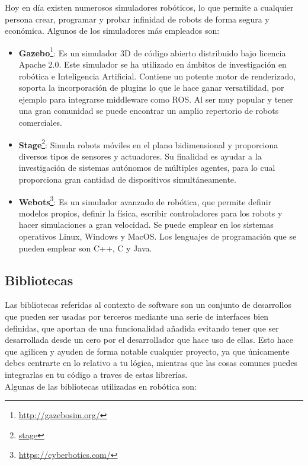 Hoy en día existen numerosos simuladores robóticos, lo que permite a cualquier persona crear, programar y probar infinidad de robots de forma segura y económica. Algunos de los simuladores más empleados son:

\begin{itemize}
\item \textbf{Gazebo}\footnote{\url{http://gazebosim.org/}}: Es un simulador 3D de código abierto distribuido bajo licencia Apache 2.0. Este simulador se ha utilizado en ámbitos de investigación en robótica e Inteligencia Artificial. Contiene un potente motor de renderizado, soporta la incorporación de plugins lo que le hace ganar versatilidad, por ejemplo para integrarse middleware como ROS. Al ser muy popular y tener una gran comunidad se puede encontrar un amplio repertorio de robots comerciales.
\item \textbf{Stage}\footnote{\href{http://playerstage.sourceforge.net/index.php?src=stage}{stage}}: Simula robots móviles en el plano bidimensional y proporciona diversos tipos de sensores y actuadores. Su finalidad es ayudar a la investigación de sistemas autónomos de múltiples agentes, para lo cual proporciona gran cantidad de dispositivos simultáneamente.
\item \textbf{Webots}\footnote{\url{https://cyberbotics.com/}}: Es un simulador avanzado de robótica, que permite definir modelos propios, definir la física, escribir controladores para los robots y hacer simulaciones a gran velocidad. Se puede emplear en los sistemas operativos Linux, Windows y MacOS. Los lenguajes de programación que se pueden emplear son  C++, C y Java.
\end{itemize}

\subsection{Bibliotecas}
Las bibliotecas referidas al contexto de software son un conjunto de desarrollos que pueden ser usadas por terceros mediante una serie de interfaces bien definidas, que aportan de una funcionalidad añadida evitando tener que ser desarrollada desde un cero por el desarrollador que hace uso de ellas. Esto hace que agilicen y ayuden de forma notable cualquier proyecto, ya que únicamente debes centrarte en lo relativo a tu lógica, mientras que las cosas comunes puedes integrarlas en tu código a traves de estas librerías.\\

Algunas de las bibliotecas utilizadas en robótica son:

